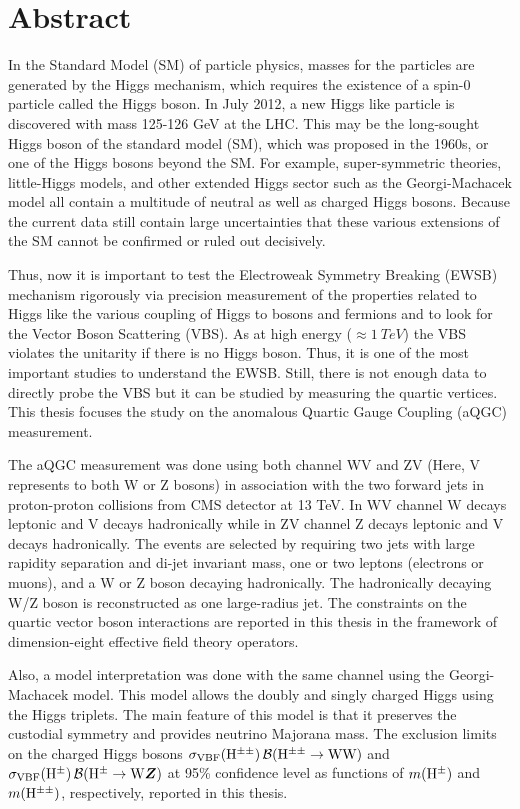 \chapter*{Abstract}  
In the Standard Model (SM) of particle physics, masses for the particles are generated by the Higgs mechanism, which requires the existence of a spin-0 particle called the Higgs boson. In July 2012, a new Higgs like particle is discovered with mass 125-126 GeV at the LHC. This may be the long-sought Higgs boson of the standard model (SM), which was proposed in the 1960s, or one of the Higgs bosons beyond the SM. For example, super-symmetric theories, little-Higgs models, and other extended Higgs sector such as the Georgi-Machacek model all contain a multitude of neutral as well as charged Higgs bosons. Because the current data still contain large uncertainties that these various extensions of the SM cannot be confirmed or ruled out decisively. 

Thus, now it is important to test the Electroweak Symmetry Breaking (EWSB) mechanism rigorously via precision measurement of the properties related to Higgs like the various coupling of Higgs to bosons and fermions and to look for the Vector Boson Scattering (VBS). As at high energy ($\approx 1~TeV$) the VBS violates the unitarity if there is no Higgs boson. Thus, it is one of the most important studies to understand the EWSB. Still, there is not enough data to directly probe the VBS but it can be studied by measuring the quartic vertices. This thesis focuses the study on the anomalous Quartic Gauge Coupling (aQGC) measurement. 

The aQGC measurement was done using both channel WV and ZV (Here, V represents to both W or Z bosons) in association with the two forward jets in proton-proton collisions from CMS detector at 13 TeV. In WV channel W decays leptonic and V decays hadronically while in ZV channel Z decays leptonic and V decays hadronically. The events are selected by requiring two jets with large rapidity separation and di-jet invariant mass, one or two leptons (electrons or muons), and a W or Z boson decaying hadronically. The hadronically decaying W/Z boson is reconstructed as one large-radius jet. The constraints on the quartic vector boson interactions are reported in this thesis in the framework of dimension-eight effective field theory operators.

Also, a model interpretation was done with the same channel using the Georgi-Machacek model. This model allows the doubly and singly charged Higgs using the Higgs triplets. The main feature of this model is that it preserves the custodial symmetry and provides neutrino Majorana mass. The exclusion limits on the charged Higgs bosons $\sigma_\mathrm{VBF}(\mathrm{H^{\pm\pm}}) \, \mathcal{B}(\mathrm{H^{\pm\pm}}\to \mathrm{W}\mathrm{W})$ and $\sigma_\mathrm{VBF}(\mathrm{H}^{\pm}) \, \mathcal{B}(\mathrm{H}^{\pm}\to \mathrm{W}\boldsymbol{Z})$ at 95\% confidence level as functions of $m(\mathrm{H}^{\pm})$ and $m(\mathrm{H^{\pm\pm}})$, respectively, reported in this thesis.

